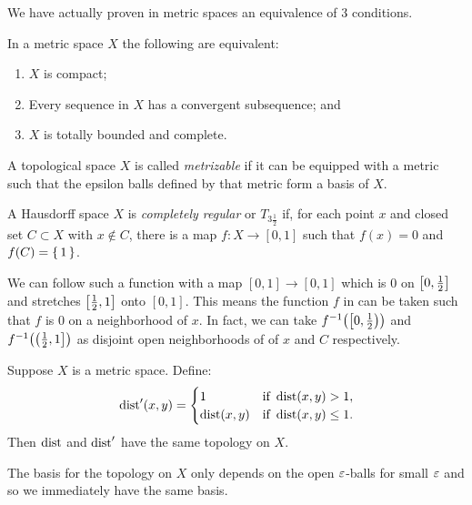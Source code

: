 \documentclass[letterpaper, 11pt]{article}
\begin{document}
We have actually proven in metric spaces an equivalence of 3 conditions.

\begin{cor}
  In a metric space $X$ the following are equivalent:
  \begin{enumerate}
  \item $X$ is compact;
  \item Every sequence in $X$ has a convergent subsequence; and
  \item $X$ is totally bounded and complete.
  \end{enumerate}
\end{cor}

\begin{defn}[Metrizable]
  A topological space $X$ is called \emph{metrizable} if it can be equipped with a metric such that the epsilon balls defined by that metric form a basis of $X$.
\end{defn}

\begin{defn}\label{defn: completely_regular}
  A Hausdorff space $X$ is \emph{completely regular} or $T_{3 \frac{1}{2}}$ if, for each point $x$ and closed set $C \subset X$ with $x \notin C$, there is a map $f\colon X \to [0, 1]$ such that $f(x) = 0$ and $f(C) = \set{1}$.
\end{defn}

We can follow such a function with a map $[0, 1] \to [0, 1]$ which is $0$ on $\bqty{0, \frac{1}{2}}$ and stretches $\bqty{\frac{1}{2}, 1}$ onto $[0, 1]$.
This means the function $f$ in  can be taken such that $f$ is $0$ on a neighborhood of $x$.
In fact, we can take $f^{-1}\pqty{\left[ 0, \frac{1}{2} \right)}$ and $f^{-1}\pqty{\left( \frac{1}{2}, 1 \right]}$ as disjoint open neighborhoods of of $x$ and $C$ respectively.

\begin{prop}\label{prop: bounded_metric_leq_1}
  Suppose $X$ is a metric space. Define:
  \[
  \operatorname{dist}'(x, y) = \begin{cases}
                   1           & \text{if } \operatorname{dist}(x, y) > 1, \\
                   \operatorname{dist}(x, y) & \text{if } \operatorname{dist}(x, y) \leq 1.
                 \end{cases}
  \]
  Then $\operatorname{dist}$ and $\operatorname{dist}'$ have the same topology on $X$.
\end{prop}
\begin{pf}
  The basis for the topology on $X$ only depends on the open $\varepsilon$-balls for small $\varepsilon$ and so we immediately have the same basis.
\end{pf}
\end{document}
